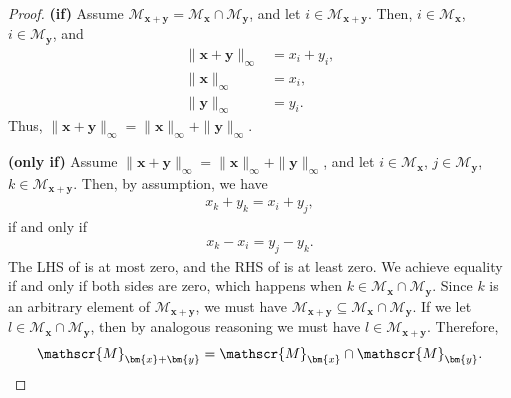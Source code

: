 \documentclass[letterpaper]{article} %
\newcommand{\bx}{{\bm{x}}}
\newcommand{\by}{{\bm{y}}}
\newcommand{\sM}{{\mathscr{M}}}
\newcommand{\argmax}{\mathrm{argmax}}
\begin{document}
\begin{proof}
    \textbf{(if)}
    Assume $\sM_{\bx+\by}=\sM_{\bx} \cap \sM_{\by}$, and let $i\in \sM_{\bx+\by}$. Then, $i\in \sM_{\bx}$, $i\in \sM_{\by}$, and
    \begin{align*}
        \|\bx+\by\|_\infty &= x_i+y_i,
        \\
        \|\bx\|_\infty &= x_i,
        \\
        \|\by\|_\infty &= y_i.
    \end{align*}
    Thus, $\|\bx+\by\|_\infty = \|\bx\|_\infty + \|\by\|_\infty$.
    
    \textbf{(only if)}
    Assume $\|\bx+\by\|_\infty = \|\bx\|_\infty + \|\by\|_\infty$, and let 
    $i \in \mathscr{M}_{\bx}$, $j \in \mathscr{M}_{\by}$, $k \in \mathscr{M}_{\bx+\by}$. 
     Then, by assumption, we have
     \begin{align*}
         x_k+y_k = x_i+y_j,
     \end{align*}
     if and only if 
     \begin{align}
         x_k-x_i = y_j - y_k. \label{eq:compare_maxs}
     \end{align}
     The LHS of  is at most zero, and the RHS of  is at least zero. We achieve equality if and only if both sides are zero, which happens when 
     $k\in\sM_{\bx}\cap \sM_{\by}$. 
     Since $k$ is an arbitrary element of 
     $\sM_{\bx+\by}$, 
     we must have 
     $\sM_{\bx+\by}\subseteq \sM_{\bx}\cap \sM_{\by}$. 
     If we let 
     $l\in \sM_{\bx}\cap \sM_{\by}$, 
     then by analogous reasoning we must have 
     $l\in\sM_{\bx+\by}$. 
     Therefore, 
     \[
        \sM_{\bx+\by}=\sM_{\bx}\cap\sM_{\by}. \qedhere
     \]
\end{proof}

\es*
\end{document}
